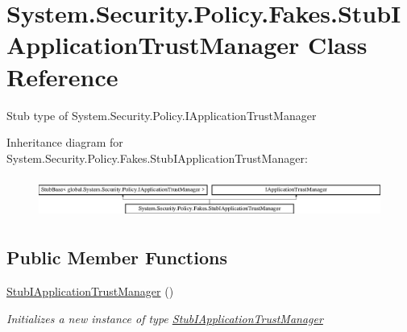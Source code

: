 \hypertarget{class_system_1_1_security_1_1_policy_1_1_fakes_1_1_stub_i_application_trust_manager}{\section{System.\-Security.\-Policy.\-Fakes.\-Stub\-I\-Application\-Trust\-Manager Class Reference}
\label{class_system_1_1_security_1_1_policy_1_1_fakes_1_1_stub_i_application_trust_manager}
}


Stub type of System.\-Security.\-Policy.\-I\-Application\-Trust\-Manager 


Inheritance diagram for System.\-Security.\-Policy.\-Fakes.\-Stub\-I\-Application\-Trust\-Manager\-:\begin{figure}[H]
\begin{center}
\leavevmode
\includegraphics[height=1.352657cm]{class_system_1_1_security_1_1_policy_1_1_fakes_1_1_stub_i_application_trust_manager}
\end{center}
\end{figure}
\subsection*{Public Member Functions}
\begin{DoxyCompactItemize}
\item 
\hyperlink{class_system_1_1_security_1_1_policy_1_1_fakes_1_1_stub_i_application_trust_manager_ad11271a367670cb5c275bdc870f6ce0e}{Stub\-I\-Application\-Trust\-Manager} ()
\begin{DoxyCompactList}\small\item\em Initializes a new instance of type \hyperlink{class_system_1_1_security_1_1_policy_1_1_fakes_1_1_stub_i_application_trust_manager}{Stub\-I\-Application\-Trust\-Manager}\end{DoxyCompactList}\end{DoxyCompactItemize}
